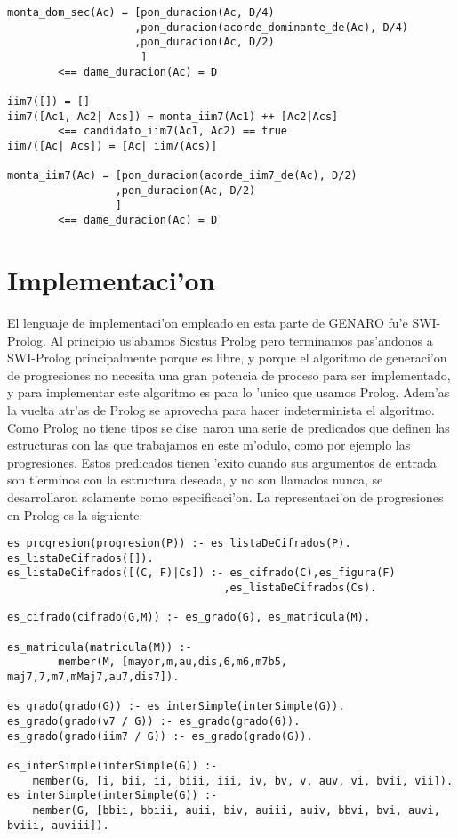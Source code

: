 \begin{enumerate}
\begin{verbatim}
monta_dom_sec(Ac) = [pon_duracion(Ac, D/4)
                    ,pon_duracion(acorde_dominante_de(Ac), D/4)
                    ,pon_duracion(Ac, D/2)
                     ]
        <== dame_duracion(Ac) = D

iim7([]) = []
iim7([Ac1, Ac2| Acs]) = monta_iim7(Ac1) ++ [Ac2|Acs]
        <== candidato_iim7(Ac1, Ac2) == true
iim7([Ac| Acs]) = [Ac| iim7(Acs)]

monta_iim7(Ac) = [pon_duracion(acorde_iim7_de(Ac), D/2)
                 ,pon_duracion(Ac, D/2)
                 ]
        <== dame_duracion(Ac) = D
        \end{verbatim}
        
\end{enumerate}




\section {Implementaci'on}
El lenguaje de implementaci'on empleado en esta parte de GENARO fu'e SWI-Prolog. Al principio us'abamos Sicstus Prolog pero terminamos pas'andonos a SWI-Prolog principalmente porque es libre, y porque el algoritmo de generaci'on de progresiones no necesita una gran potencia de proceso para ser implementado, y para implementar este algoritmo es para lo 'unico que usamos Prolog. Adem'as la vuelta atr'as de Prolog se aprovecha para hacer indeterminista el algoritmo.
\newline
Como Prolog no tiene tipos se dise~naron una serie de predicados que definen las estructuras con las que trabajamos en este m'odulo, como por ejemplo las progresiones. Estos predicados tienen 'exito cuando sus argumentos de entrada son t'erminos con la estructura deseada, y no son llamados nunca, se desarrollaron solamente como especificaci'on.
\newline
La representaci'on de progresiones en Prolog es la siguiente:
        \begin{verbatim}
es_progresion(progresion(P)) :- es_listaDeCifrados(P).
es_listaDeCifrados([]).
es_listaDeCifrados([(C, F)|Cs]) :- es_cifrado(C),es_figura(F)
                                  ,es_listaDeCifrados(Cs).

es_cifrado(cifrado(G,M)) :- es_grado(G), es_matricula(M).

es_matricula(matricula(M)) :- 
        member(M, [mayor,m,au,dis,6,m6,m7b5, maj7,7,m7,mMaj7,au7,dis7]).

es_grado(grado(G)) :- es_interSimple(interSimple(G)).
es_grado(grado(v7 / G)) :- es_grado(grado(G)).
es_grado(grado(iim7 / G)) :- es_grado(grado(G)).

es_interSimple(interSimple(G)) :-	
	member(G, [i, bii, ii, biii, iii, iv, bv, v, auv, vi, bvii, vii]).
es_interSimple(interSimple(G)) :-	
 	member(G, [bbii, bbiii, auii, biv, auiii, auiv, bbvi, bvi, auvi, bviii, auviii]).
        \end{verbatim}
